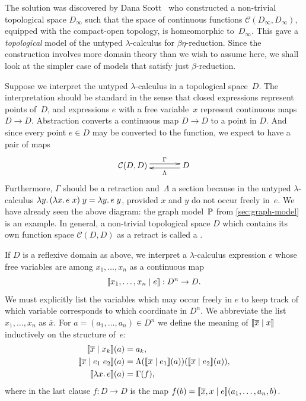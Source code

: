 The solution was discovered by Dana Scott~ who
constructed a non-trivial topological space $D_\infty$ such that the
space of continuous functions $\mathcal{C}(D_\infty, D_\infty)$,
equipped with the compact-open topology, is homeomorphic
to~$D_\infty$. This gave a \emph{topological} model of the untyped
$\lambda$-calculus for $\beta\eta$-reduction. Since the construction
involves more domain theory than we wish to assume here, we shall look
at the simpler case of models that satisfy just $\beta$-reduction.

Suppose we interpret the untyped $\lambda$-calculus in a topological
space~$D$. The interpretation should be standard in the sense that
closed expressions represent points of~$D$, and expressions $e$ with a
free variable~$x$ represent continuous maps $D \to D$. Abstraction
converts a continuous map $D \to D$ to a point in $D$. And since every
point $e \in D$ may be converted to the function, we expect to have a
pair of maps
%
\begin{equation*}
  \xymatrix{
    **[l]{\mathcal{C}(D, D)}
    \ar@<+0.25em>[r]^{\Gamma}
    &
    {D}
    \ar@<+0.25em>[l]^{\Lambda}
  }
\end{equation*}
%
Furthermore, $\Gamma$ should be a retraction and~$\Lambda$ a section
because in the untyped $\lambda$-calculus
$\lambda y .\,(\lambda x .\,e\;x)\; y = \lambda y .\,e\;y$, provided $x$ and
$y$ do not occur freely in~$e$. We have already seen the above
diagram: the graph model~$\mathbb{P}$ from \cref{sec:graph-model}
is an example. In general, a non-trivial topological
space $D$ which contains its own function space $\mathcal{C}(D,D)$ as
a retract is called a .

If $D$ is a reflexive domain as above, we interpret a
$\lambda$-calculus expression $e$ whose free variables are among $x_1,
\ldots, x_n$ as a continuous map
%
\begin{equation*}
  [\![x_1, \ldots, x_n \mid e]\!] : D^n \to D.
\end{equation*}
%
We must explicitly list the variables which may occur freely in $e$ to
keep track of which variable corresponds to which coordinate in $D^n$.
We abbreviate the list $x_1, \ldots, x_n$ as $\overline{x}$. For $a = (a_1,
\ldots, a_n) \in D^n$ we define the meaning of $[\![\overline{x} \mid x]\!]$
inductively on the structure of~$e$:
%
\begin{align*}
  \sem{\overline{x} \ctx x_k}(a) &= a_k, \\
  \sem{\overline{x} \ctx e_1\; e_2}(a) &= 
  \Lambda(\sem{\overline{x} \ctx e_1}(a))(\sem{\overline{x} \ctx e_2}(a)), \\
  \sem{\lam{x}{e}}(a) &= \Gamma(f),
\end{align*}
%
where in the last clause $f : D \to D$ is the map $f (b) =
[\![\overline{x}, x \mid e]\!](a_1, \ldots, a_n, b)$.

